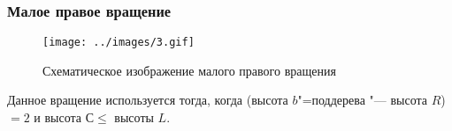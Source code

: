\begin{frame}
    \frametitle{Малое правое вращение}

    \begin{figure}[ht]
        \texttt{[image: ../images/3.gif]}
        
        \caption{Схематическое изображение малого правого вращения}
    \end{figure}

    Данное вращение используется тогда,
    когда (высота $b$"=поддерева "--- высота $R$)
    $= 2$ и высота $С \leqslant $ высоты $L$.
\end{frame}